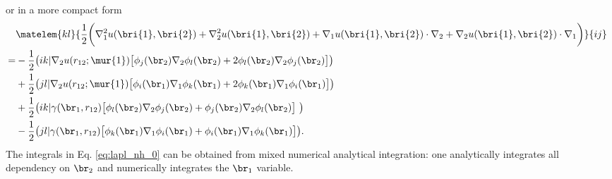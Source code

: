 or in a more compact form 
\begin{equation}
 \label{eq:lapl_nh_0}
 \begin{aligned}
& \matelem{kl}{\frac{1}{2}\bigg( \nabla_1^2 u(\bri{1},\bri{2}) + \nabla_2^2u(\bri{1},\bri{2}) + \nabla_1 u(\bri{1},\bri{2}) \cdot \nabla_2 + \nabla_2 u(\bri{1},\bri{2}) \cdot \nabla_1 \bigg)}{ij} \\
=& -\frac{1}{2} \big(ik|\nabla_2u(r_{12};\mur{1}) \big[ \phi_j(\br_2)\nabla_2 \phi_l(\br_2) + 2 \phi_l(\br_2) \nabla_2 \phi_j(\br_2)\big] \big) \\
 & +\frac{1}{2} \big(jl|\nabla_2u(r_{12};\mur{1}) \big[ \phi_i(\br_1)\nabla_1 \phi_k(\br_1) + 2 \phi_k(\br_1) \nabla_1 \phi_i(\br_1)\big] \big) \\
 & +\frac{1}{2} \big(ik|{\bf {\gamma}}(\br_1, r_{12}) \big[ \phi_l(\br_2)\nabla_2 \phi_j(\br_2) + \phi_j(\br_2)\nabla_2 \phi_l(\br_2) \big] \big) \\
 & -\frac{1}{2} \big(jl|{\bf {\gamma}}(\br_1, r_{12}) \big[ \phi_k(\br_1) \nabla_1 \phi_i(\br_1) + \phi_i(\br_1) \nabla_1 \phi_k(\br_1) \big] \big).
 \end{aligned}
\end{equation}
The integrals in Eq. \eqref{eq:lapl_nh_0} can be obtained from mixed numerical analytical integration: one analytically integrates all dependency on $\br_2$ and numerically integrates the $\br_1$ variable. 

